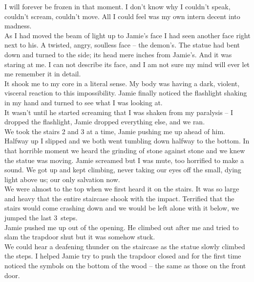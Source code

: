 \documentclass[a5paper]{scrartcl}
\begin{document}
I will forever be frozen in that moment. I don't know why I couldn't speak, couldn't scream, couldn't move. All I could feel was my own intern decent into madness.\\


As I had moved the beam of light up to Jamie's face I had seen another face right next to his. A twisted, angry, soulless face – the demon's. The statue had bent down and turned to the side; its head mere inches from Jamie's. And it was staring at me. I can not describe its face, and I am not sure my mind will ever let me remember it in detail. \\


It shook me to my core in a literal sense. My body was having a dark, violent, visceral reaction to this impossibility. Jamie finally noticed the flashlight shaking in my hand and turned to see what I was looking at. \\


It wasn't until he started screaming that I was shaken from my paralysis – I dropped the flashlight, Jamie dropped everything else, and we ran.\\


We took the stairs 2 and 3 at a time, Jamie pushing me up ahead of him. Halfway up I slipped and we both went tumbling down halfway to the bottom. In that horrible moment we heard the grinding of stone against stone and we knew the statue was moving. Jamie screamed but I was mute, too horrified to make a sound. We got up and kept climbing, never taking our eyes off the small, dying light above us; our only salvation now.\\


We were almost to the top when we first heard it on the stairs. It was so large and heavy that the entire staircase shook with the impact. Terrified that the stairs would come crashing down and we would be left alone with it below, we jumped the last 3~steps.\\


Jamie pushed me up out of the opening. He climbed out after me and tried to slam the trapdoor shut but it was somehow stuck.\\


We could hear a deafening thunder on the staircase as the statue slowly climbed the steps. I helped Jamie try to push the trapdoor closed and for the first time noticed the symbols on the bottom of the wood – the same as those on the front door.\\
\end{document}
